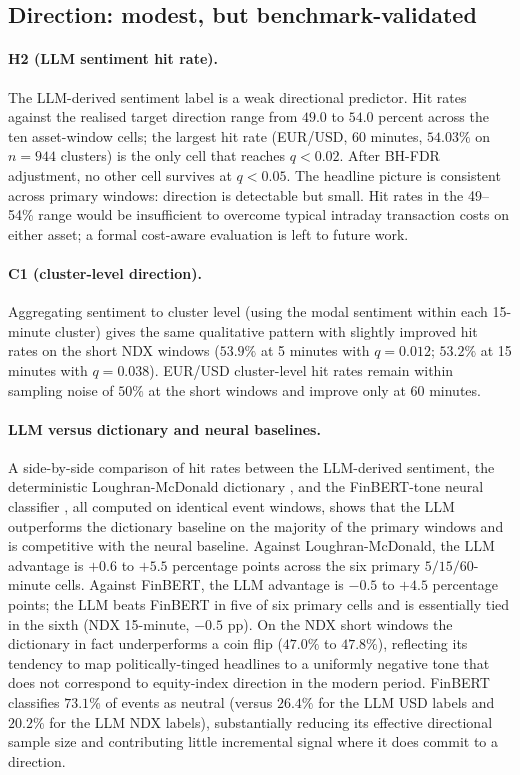 \subsection{Direction: modest, but benchmark-validated}
\label{ssec:results-direction}

\paragraph{H2 (LLM sentiment hit rate).}
The LLM-derived sentiment label is a weak directional predictor.
Hit rates against the realised target direction range from $49.0$ to
$54.0$ percent across the ten asset-window cells; the largest hit
rate (EUR/USD, 60 minutes, $54.03\%$ on $n = 944$ clusters) is the
only cell that reaches $q < 0.02$. After BH-FDR adjustment, no
other cell survives at $q < 0.05$. The headline picture is
consistent across primary windows: direction is detectable but
small. Hit rates in the 49--54\% range would be insufficient to
overcome typical intraday transaction costs on either asset; a
formal cost-aware evaluation is left to future work.

\paragraph{C1 (cluster-level direction).}
Aggregating sentiment to cluster level (using the modal sentiment
within each 15-minute cluster) gives the same qualitative pattern
with slightly improved hit rates on the short NDX windows
($53.9\%$ at 5 minutes with $q = 0.012$; $53.2\%$ at 15 minutes
with $q = 0.038$). EUR/USD cluster-level hit rates remain within
sampling noise of $50\%$ at the short windows and improve only at
60 minutes.

\paragraph{LLM versus dictionary and neural baselines.}
A side-by-side comparison of hit rates between the LLM-derived
sentiment, the deterministic Loughran-McDonald dictionary
\citep{loughran2011liability}, and the FinBERT-tone neural
classifier \citep{yang2020finbert}, all computed on identical event
windows, shows that the LLM outperforms the dictionary baseline on
the majority of the primary windows and is competitive with the
neural baseline. Against Loughran-McDonald, the LLM
advantage is $+0.6$ to $+5.5$ percentage points across the six
primary $5/15/60$-minute cells. Against FinBERT, the LLM advantage
is $-0.5$ to $+4.5$ percentage points; the LLM beats FinBERT in
five of six primary cells and is essentially tied in the sixth
(NDX 15-minute, $-0.5$ pp). On the NDX short windows the dictionary
in fact underperforms a coin flip ($47.0\%$ to $47.8\%$), reflecting
its tendency to map politically-tinged headlines to a uniformly
negative tone that does not correspond to equity-index direction in
the modern period. FinBERT classifies $73.1\%$ of events as neutral
(versus $26.4\%$ for the LLM USD labels and $20.2\%$ for the LLM
NDX labels), substantially reducing its effective directional
sample size and contributing little incremental signal where it
does commit to a direction.

